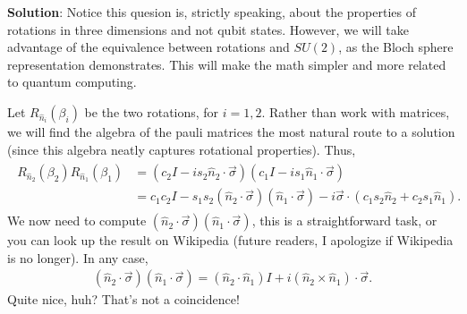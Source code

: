 \documentclass{book}
\begin{document}
    \textbf{Solution}: Notice this quesion is, strictly speaking, about the properties of rotations in three dimensions and not qubit states. However, we will take advantage of the equivalence between rotations and $SU(2)$, as the Bloch sphere representation demonstrates. This will make the math simpler and more related to quantum computing.

    Let $R_{\hat{n}_i}(\beta_i)$ be the two rotations, for $i = 1,2$. Rather than work with matrices, we will find the algebra of the pauli matrices the most natural route to a solution (since this algebra neatly captures rotational properties). Thus,
    \begin{align} \label{eq:4.15_multalg}
    \begin{aligned}
        R_{\hat{n}_2}(\beta_2)R_{\hat{n}_1}(\beta_1) &= (c_2 I - i s_2 \hat{n}_2 \cdot \vec{\sigma})(c_1 I - i s_1 \hat{n}_1 \cdot \vec{\sigma}) \\
        &= c_1c_2 I - s_1 s_2 (\hat{n}_2 \cdot \vec{\sigma}) (\hat{n}_1 \cdot \vec{\sigma}) - i \vec{\sigma} \cdot (c_1 s_2 \hat{n}_2 + c_2 s_1 \hat{n}_1).
    \end{aligned}
    \end{align}
    We now need to compute $(\hat{n}_2 \cdot \vec{\sigma}) (\hat{n}_1 \cdot \vec{\sigma})$, this is a straightforward task, or you can look up the result on Wikipedia (future readers, I apologize if Wikipedia is no longer). In any case,
    \begin{align}
        (\hat{n}_2 \cdot \vec{\sigma}) (\hat{n}_1 \cdot \vec{\sigma}) = (\hat{n}_2 \cdot \hat{n}_1) I + i (\hat{n}_2 \times \hat{n}_1) \cdot \vec{\sigma}.
    \end{align}
    Quite nice, huh? That's not a coincidence! 
    
\end{document}
